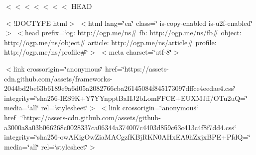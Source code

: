 $<$$<$$<$$<$$<$$<$$<$ H\+E\+A\+D

$<$!\+D\+O\+C\+T\+Y\+P\+E html$>$ $<$html lang=\char`\"{}en\char`\"{} class=\char`\"{} is-\/copy-\/enabled is-\/u2f-\/enabled\char`\"{}$>$ $<$head prefix=\char`\"{}og\+: http\+://ogp.\+me/ns\# fb\+: http\+://ogp.\+me/ns/fb\# object\+: http\+://ogp.\+me/ns/object\# article\+: http\+://ogp.\+me/ns/article\# profile\+: http\+://ogp.\+me/ns/profile\#\char`\"{}$>$ $<$meta charset=\char`\"{}utf-\/8\char`\"{}$>$

$<$link crossorigin=\char`\"{}anonymous\char`\"{} href=\char`\"{}https\+://assets-\/cdn.\+github.\+com/assets/frameworks-\/2044bd2be63b6189e9a6d05a2082766cba26145084f845173097dffce4eedae4.\+css\char`\"{} integrity=\char`\"{}sha256-\/\+I\+E\+S9\+K+\+Y7\+Y\+Ynppt\+Ba\+I\+I\+J2b\+Lom\+F\+F\+C\+E+\+E\+U\+X\+M\+Jff/\+O\+Tu2u\+Q=\char`\"{} media=\char`\"{}all\char`\"{} rel=\char`\"{}stylesheet\char`\"{}$>$ $<$link crossorigin=\char`\"{}anonymous\char`\"{} href=\char`\"{}https\+://assets-\/cdn.\+github.\+com/assets/github-\/a3000a8a03b066268c0028337ca06344a374007c4403d859c63c413c4f8f7dd4.\+css\char`\"{} integrity=\char`\"{}sha256-\/ow\+A\+Kig\+Ow\+Zia\+M\+A\+Cgzf\+K\+Bj\+R\+K\+N0\+A\+Hx\+E\+A9h\+Zxjx\+B\+P\+E+\+Pfd\+Q=\char`\"{} media=\char`\"{}all\char`\"{} rel=\char`\"{}stylesheet\char`\"{}$>$

